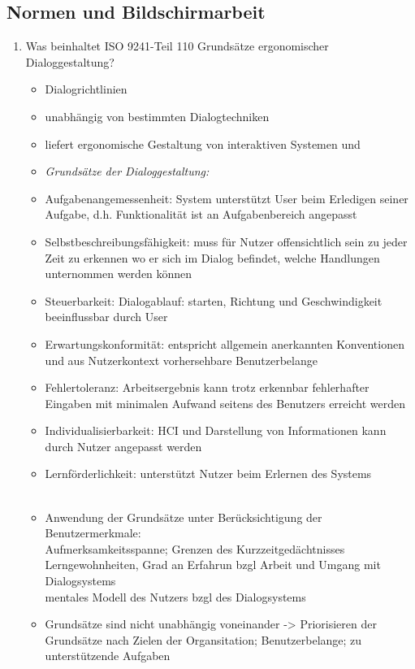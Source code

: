 \subsection{Normen und Bildschirmarbeit}
\begin{enumerate}
	\item Was beinhaltet ISO 9241-Teil 110 Grundsätze ergonomischer Dialoggestaltung?
	\begin{itemize}
		\item Dialogrichtlinien
		\item unabhängig von bestimmten Dialogtechniken
		\item liefert ergonomische Gestaltung von interaktiven Systemen und
		\item \textit{Grundsätze der Dialoggestaltung:}
		\item Aufgabenangemessenheit: System unterstützt User beim Erledigen seiner Aufgabe, d.h. Funktionalität ist an Aufgabenbereich angepasst
		\item Selbstbeschreibungsfähigkeit: muss für Nutzer offensichtlich sein zu jeder Zeit zu erkennen wo er sich im Dialog befindet, welche Handlungen unternommen werden können
		\item Steuerbarkeit: Dialogablauf: starten, Richtung und Geschwindigkeit beeinflussbar durch User
		\item Erwartungskonformität: entspricht allgemein anerkannten Konventionen und aus Nutzerkontext vorhersehbare Benutzerbelange
		\item Fehlertoleranz: Arbeitsergebnis kann trotz erkennbar fehlerhafter Eingaben mit minimalen Aufwand seitens des Benutzers erreicht werden
		\item Individualisierbarkeit: HCI und Darstellung von Informationen kann durch Nutzer angepasst werden
		\item Lernförderlichkeit: unterstützt Nutzer beim Erlernen des Systems\\
		\\
		\item Anwendung der Grundsätze  unter Berücksichtigung der Benutzermerkmale: \\
		Aufmerksamkeitsspanne; Grenzen des Kurzzeitgedächtnisses\\
		Lerngewohnheiten, Grad an Erfahrun bzgl Arbeit und Umgang mit Dialogsystems\\
		mentales Modell des Nutzers bzgl des Dialogsystems
		\item Grundsätze sind nicht unabhängig voneinander -> Priorisieren der Grundsätze nach Zielen der Organsitation; Benutzerbelange; zu unterstützende Aufgaben
	\end{itemize}
	

\end{enumerate}
